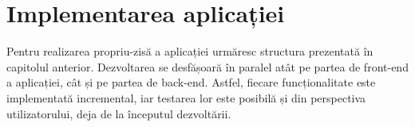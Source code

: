 \documentclass[12pt,a4paper]{report}
\theoremstyle{definition}
\theoremstyle{remark}
\begin{document}







\chapter{Implementarea aplicației}
\par Pentru realizarea propriu-zisă a aplicației urmăresc structura prezentată în capitolul anterior. Dezvoltarea se desfășoară în paralel atât pe partea de front-end a aplicației, cât și pe partea de back-end. Astfel, fiecare funcționalitate este implementată incremental, iar testarea lor este posibilă și din perspectiva utilizatorului, deja de la începutul dezvoltării.
\end{document}
